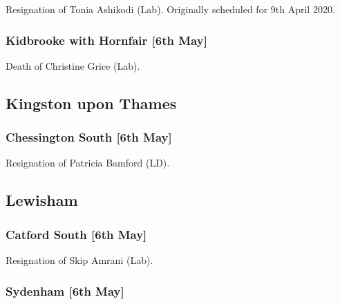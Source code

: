 \documentclass[a4paper,openany]{book}
\begin{document}
\begin{resultsiii}

Resignation of Tonia Ashikodi (Lab).  Originally scheduled for 9th April 2020.

\subsubsection*{Kidbrooke with Hornfair \hspace*{\fill}\nolinebreak[1]%
	\enspace\hspace*{\fill}
	[6th May]}


Death of Christine Grice (Lab).

\subsection*{Kingston upon Thames}

\subsubsection*{Chessington South \hspace*{\fill}\nolinebreak[1]%
	\enspace\hspace*{\fill}
	[6th May]}


Resignation of Patricia Bamford (LD).

\subsection*{Lewisham}

\subsubsection*{Catford South \hspace*{\fill}\nolinebreak[1]%
	\enspace\hspace*{\fill}
	[6th May]}


Resignation of Skip Amrani (Lab).

\subsubsection*{Sydenham \hspace*{\fill}\nolinebreak[1]%
	\enspace\hspace*{\fill}
	[6th May]}


\end{resultsiii}
\end{document}
